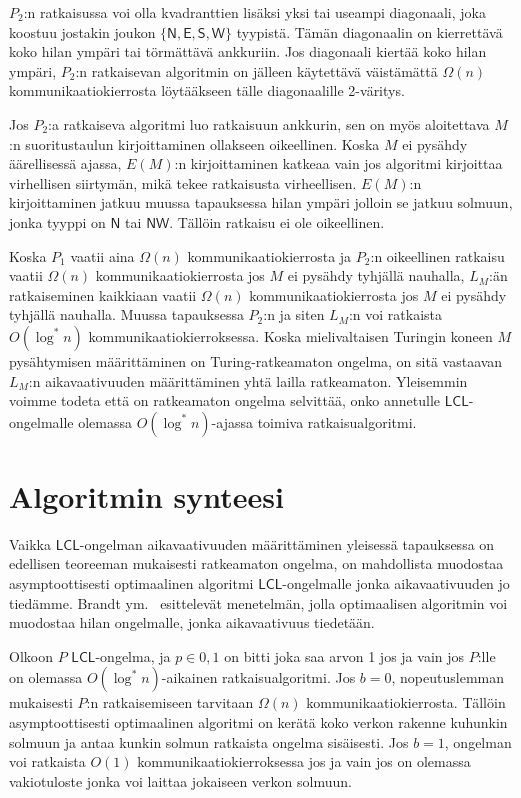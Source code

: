 \documentclass[12pt,finnish]{tktltiki2}
\theoremstyle{definition}
\theoremstyle{remark}
\newcommand*{\lcl}{\ensuremath{\mathsf{LCL}}}
\begin{document}
$P_2$:n ratkaisussa voi olla kvadranttien lisäksi yksi tai useampi diagonaali, joka koostuu jostakin joukon $\{\mathsf{N}, \mathsf{E},\mathsf{S},\mathsf{W}\}$ tyypistä. Tämän diagonaalin on kierrettävä koko hilan ympäri tai törmättävä ankkuriin. Jos diagonaali kiertää koko hilan ympäri, $P_2$:n ratkaisevan algoritmin on jälleen käytettävä väistämättä $\Omega(n)$ kommunikaatiokierrosta löytääkseen tälle diagonaalille 2-väritys.

Jos $P_2$:a ratkaiseva algoritmi luo ratkaisuun ankkurin, sen on myös aloitettava $M$:n suoritustaulun kirjoittaminen ollakseen oikeellinen. Koska $M$ ei pysähdy äärellisessä ajassa, $E(M)$:n kirjoittaminen katkeaa vain jos algoritmi kirjoittaa virhellisen siirtymän, mikä tekee ratkaisusta virheellisen. $E(M)$:n kirjoittaminen jatkuu muussa tapauksessa hilan ympäri jolloin se jatkuu solmuun, jonka tyyppi on $\mathsf{N}$ tai $\mathsf{NW}$. Tällöin ratkaisu ei ole oikeellinen.

Koska $P_1$ vaatii aina $\Omega(n)$ kommunikaatiokierrosta ja $P_2$:n oikeellinen ratkaisu vaatii $\Omega(n)$ kommunikaatiokierrosta jos $M$ ei pysähdy tyhjällä nauhalla, $L_M$:än ratkaiseminen kaikkiaan vaatii $\Omega(n)$ kommunikaatiokierrosta jos $M$ ei pysähdy tyhjällä nauhalla. Muussa tapauksessa $P_2$:n ja siten $L_M$:n voi ratkaista $O(\log^* n)$ kommunikaatiokierroksessa. Koska mielivaltaisen Turingin koneen $M$ pysähtymisen määrittäminen on Turing-ratkeamaton ongelma, on sitä vastaavan $L_M$:n aikavaativuuden määrittäminen yhtä lailla ratkeamaton. Yleisemmin voimme todeta että on ratkeamaton ongelma selvittää, onko annetulle \lcl -ongelmalle olemassa $O(\log^* n)$-ajassa toimiva ratkaisualgoritmi.

\section{Algoritmin synteesi}
Vaikka \lcl -ongelman aikavaativuuden määrittäminen yleisessä tapauksessa on edellisen teoreeman mukaisesti ratkeamaton ongelma, on mahdollista muodostaa asymptoottisesti optimaalinen algoritmi \lcl -ongelmalle jonka aikavaativuuden jo tiedämme. Brandt ym.~\cite{brandt} esittelevät menetelmän, jolla optimaalisen algoritmin voi muodostaa hilan ongelmalle, jonka aikavaativuus tiedetään.

Olkoon $P$ \lcl -ongelma, ja $p \in {0, 1}$ on bitti joka saa arvon 1 jos ja vain jos $P$:lle on olemassa $O(\log^* n)$-aikainen ratkaisualgoritmi. Jos $b = 0$, nopeutuslemman mukaisesti $P$:n ratkaisemiseen tarvitaan $\Omega(n)$ kommunikaatiokierrosta. Tällöin asymptoottisesti optimaalinen algoritmi on kerätä koko verkon rakenne kuhunkin solmuun ja antaa kunkin solmun ratkaista ongelma sisäisesti. Jos $b = 1$, ongelman voi ratkaista $O(1)$ kommunikaatiokierroksessa jos ja vain jos on olemassa vakiotuloste jonka voi laittaa jokaiseen verkon solmuun.
\end{document}
